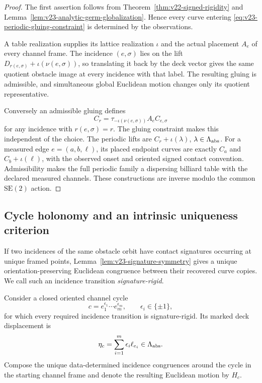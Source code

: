 \begin{proof}
The first assertion follows from Theorem~\ref{thm:v22-signed-rigidity} and
Lemma~\ref{lem:v23-analytic-germ-globalization}.  Hence every curve entering
\eqref{eq:v23-periodic-gluing-constraint} is determined by the observations.

A table realization supplies its lattice realization \(\iota\) and the actual
placement \(A_e\) of every channel frame.  The incidence \((e,\sigma)\) lies
on the lift
\(D_{r(e,\sigma)}+\iota(\nu(e,\sigma))\), so translating it back by the deck
vector gives the same quotient obstacle image at every incidence with that
label.  The resulting gluing is admissible, and simultaneous global Euclidean
motion changes only its quotient representative.

Conversely an admissible gluing defines
\[
 C_r=\tau_{-\iota(\nu(e,\sigma))}A_eC_{e,\sigma}
\]
for any incidence with \(r(e,\sigma)=r\).  The gluing constraint makes this
independent of the choice.  The periodic lifts are
\(C_r+\iota(\lambda)\), \(\lambda\in\Lambda_{\rm abs}\).  For a measured edge
\(e=(a,b,\ell)\), its placed endpoint curves are exactly
\(C_a\) and \(C_b+\iota(\ell)\), with the observed onset and oriented signed
contact convention.  Admissibility makes the full periodic family a dispersing
billiard table with the declared measured channels.  These constructions are
inverse modulo the common \(\mathrm{SE}(2)\) action.
\end{proof}

\subsection{Cycle holonomy and an intrinsic uniqueness criterion}

If two incidences of the same obstacle orbit have contact signatures occurring
at unique framed points, Lemma~\ref{lem:v23-signature-symmetry} gives a unique
orientation-preserving Euclidean congruence between their recovered curve
copies.  We call such an incidence transition \emph{signature-rigid}.

Consider a closed oriented channel cycle
\[
 c=e_1^{\epsilon_1}\cdots e_m^{\epsilon_m},
 \qquad \epsilon_i\in\{\pm1\},
\]
for which every required incidence transition is signature-rigid.  Its marked
deck displacement is
\begin{equation}\label{eq:v23-cycle-deck}
 \eta_c=\sum_{i=1}^m\epsilon_i\ell_{e_i}
 \in\Lambda_{\rm abs}.
\end{equation}
Compose the unique data-determined incidence congruences around the cycle in
the starting channel frame and denote the resulting Euclidean motion by
\(H_c\).

